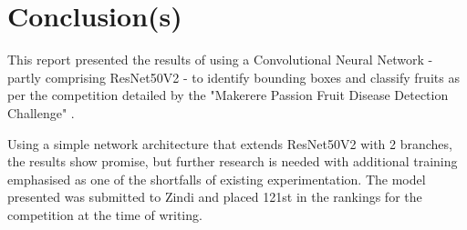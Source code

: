 \section{Conclusion(s)}
This report presented the results of using a Convolutional Neural Network - partly comprising ResNet50V2 \cite{ResNet50V2} - to identify bounding boxes and classify fruits as per the competition detailed by the "Makerere Passion Fruit Disease Detection Challenge" \cite{zindi}.

Using a simple network architecture that extends ResNet50V2 \cite{ResNet50V2} with 2 branches, the results show promise, but further research is needed with additional training emphasised as one of the shortfalls of existing experimentation. The model presented was submitted to Zindi \cite{zindi} and placed 121st in the rankings for the competition at the time of writing.